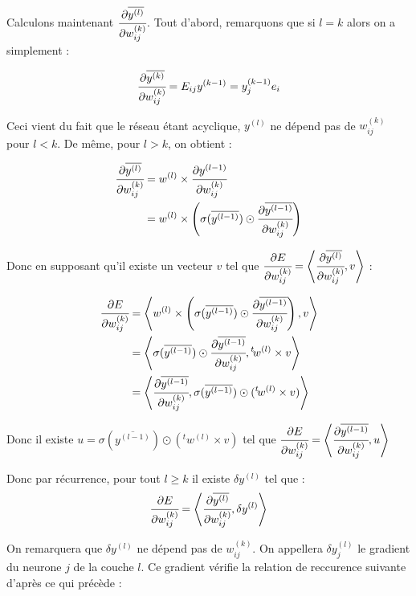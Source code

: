 Calculons maintenant $\cfrac{\partial \overline{y^{(l)}}}{\partial w_{ij}^{(k)}}$.
Tout d'abord, remarquons que si $l = k$ alors on a simplement :

\[\cfrac{\partial \overline{y^{(k)}}}{\partial w_{ij}^{(k)}} = E_{ij} y^{(k-1)} = y^{(k-1)}_j e_i\]

Ceci vient du fait que le réseau étant acyclique, $ y^{(l)}$ ne dépend pas de
$w_{ij}^{(k)}$ pour $l < k$. De même, pour $l > k$, on obtient :

\begin{align*}
\cfrac{\partial \overline{y^{(l)}}}{\partial w_{ij}^{(k)}} &= w^{(l)} \times \cfrac{\partial y^{(l-1)}}{\partial w_{ij}^{(k)}}\\
&= w^{(l)} \times \left(\sigma(\overline{y^{(l-1)}}) \odot \cfrac{\partial \overline{y^{(l-1)}}}{\partial w_{ij}^{(k)}}\right)
\end{align*}

Donc en supposant qu'il existe un vecteur $v$ tel que $\cfrac{\partial E}{\partial w_{ij}^{(k)}} = \left\langle\cfrac{\partial \overline{y^{(l)}}}{\partial w_{ij}^{(k)}} ,v\right\rangle$ :

\begin{align*}
\cfrac{\partial E}{\partial w_{ij}^{(k)}} &= \left\langle w^{(l)} \times \left(\sigma(\overline{y^{(l-1)}}) \odot \cfrac{\partial \overline{y^{(l-1)}}}{\partial w_{ij}^{(k)}}\right) ,v\right\rangle\\
&= \left\langle\sigma(\overline{y^{(l-1)}}) \odot \cfrac{\partial \overline{y^{(l-1)}}}{\partial w_{ij}^{(k)}},{}^t \! w^{(l)} \times v\right\rangle\\
&= \left\langle\cfrac{\partial \overline{y^{(l-1)}}}{\partial w_{ij}^{(k)}},\sigma(\overline{y^{(l-1)}}) \odot ({}^t \! w^{(l)} \times v)\right\rangle\\
\end{align*}

Donc il existe $u = \sigma(\overline{y^{(l-1)}}) \odot ({}^t \! w^{(l)} \times v)$
tel que $\cfrac{\partial E}{\partial w_{ij}^{(k)}} = \left\langle\cfrac{\partial \overline{y^{(l-1)}}}{\partial w_{ij}^{(k)}} ,u\right\rangle$

Donc par récurrence, pour tout $l \geq k$ il existe $\delta y^{(l)}$ tel que :
\[\cfrac{\partial E}{\partial w_{ij}^{(k)}} = \left\langle\cfrac{\partial \overline{y^{(l)}}}{\partial w_{ij}^{(k)}} ,\delta y^{(l)}\right\rangle\]

On remarquera que $\delta y^{(l)}$ ne dépend pas de $w_{ij}^{(k)}$. On appellera
 $\delta y^{(l)}_j$ le gradient du neurone $j$ de la couche $l$. Ce gradient vérifie la relation de reccurence suivante d'après ce qui précède :

